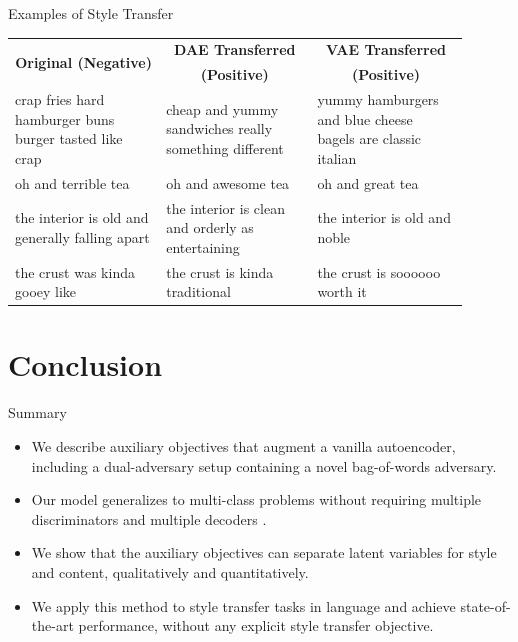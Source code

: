 \documentclass[aspectratio=169]{beamer}
\newcommand{\tabh}[1]{\multicolumn{1}{c|}{\textbf{#1}}}
\newcommand{\tabc}[2]{\multicolumn{1}{|c||}{\multirow{#1}{*}{\textbf{#2}}}}
\begin{document}
\begin{frame}{Examples of Style Transfer}
	\centering
	\begin{table}[ht]
		\centering
		\begin{tabular}{| p{0.3\linewidth} || p{0.3\linewidth} | p{0.3\linewidth} |}
			\hline
			\tabc{2}{Original (Negative)}                          & \tabh{DAE Transferred}                                & \tabh{VAE Transferred}                                      \\
			                                                       & \tabh{(Positive)}                                     & \tabh{(Positive)}                                           \\
			\hline
			\hline
			crap fries hard hamburger buns burger tasted like crap & cheap and yummy sandwiches really something different & yummy hamburgers and blue cheese bagels are classic italian \\
			\hline
			oh and terrible tea                                    & oh and awesome tea                                    & oh and great tea                                            \\
			\hline
			the interior is old and generally falling apart        & the interior is clean and orderly as entertaining     & the interior is old and noble                               \\
			\hline
			the crust was kinda gooey like                         & the crust is kinda traditional                        & the crust is soooooo worth it                               \\
			\hline
		\end{tabular}
	\end{table}
\end{frame}

% 

\section{Conclusion}

\begin{frame}{Summary}
	\begin{itemize}
		\item We describe auxiliary objectives that augment a vanilla autoencoder, including a dual-adversary setup containing a novel bag-of-words adversary.
		\item Our model generalizes to multi-class problems without requiring multiple discriminators \citep{hu2017toward,shen2017style} and multiple decoders \citep{fu2017style,prabhumoye2018style}.
		\item We show that the auxiliary objectives can separate latent variables for style and content, qualitatively and quantitatively.
		\item We apply this method to style transfer tasks in language and achieve state-of-the-art performance, without any explicit style transfer objective.
	\end{itemize}
\end{frame}
\end{document}
